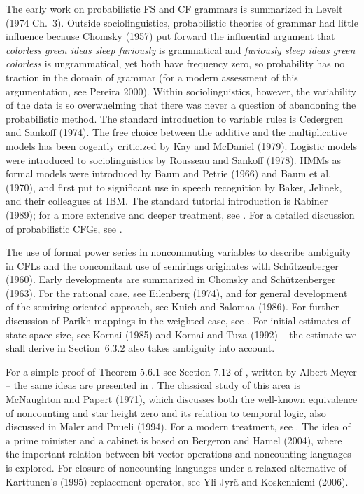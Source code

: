 The early work on probabilistic FS and CF grammars is summarized in Levelt
(1974 Ch.~3).\nocite{Levelt:1974} Outside sociolinguistics, probabilistic
theories of grammar had little influence because Chomsky (1957) put forward
the influential argument that {\it colorless green ideas sleep furiously} is
grammatical and {\it *furiously sleep ideas green colorless} is ungrammatical,
yet both have frequency zero, so probability has no traction in the domain of
grammar (for a modern assessment of this argumentation, see Pereira
2000).\nocite{Pereira:2000} Within sociolinguistics, however, the variability
of the data is so overwhelming that there was never a question of abandoning
the probabilistic method. The standard introduction to variable rules is
Cedergren and Sankoff (1974). The free choice between the additive and the
multiplicative models has been cogently criticized by Kay and McDaniel (1979).
\nocite{Kay:1979} Logistic models were introduced to sociolinguistics by
Rousseau and Sankoff (1978).\nocite{Rousseau:1978} HMMs as formal models were
introduced by Baum and Petrie (1966) and Baum et al. (1970),\nocite{Baum:1966}
\nocite{Baum:1970} and first put to significant use in speech recognition by
Baker, Jelinek, and their colleagues at IBM. The standard tutorial
introduction is Rabiner (1989);\nocite{Rabiner:1989} for a more extensive and
deeper treatment, see .  For a detailed discussion of
probabilistic CFGs, see .

The use of formal power series in noncommuting variables to describe ambiguity
in CFLs and the concomitant use of semirings originates with
\nocite{Schu2tzenberge:1960} Sch\"{u}tzenberger (1960).  Early developments
are summarized in \nocite{Chomsky:1963} Chomsky and Sch\"{u}tzenberger (1963).
For the rational case, see Eilenberg (1974), and for general development of
the semiring-oriented approach, see Kuich and Salomaa (1986).
\nocite{Kuich:1986} For further discussion of Parikh mappings in the weighted
case, see . For initial estimates of state space size, see
Kornai (1985) and Kornai and Tuza (1992) -- the estimate we shall derive in
Section~6.3.2 also takes ambiguity into account. \nocite{Kornai:1985}
\nocite{Kornai:1992}

For a simple proof of Theorem 5.6.1 see Section 7.12 of
, written by Albert Meyer -- the same ideas are
presented in .  The classical study of this area is
McNaughton and Papert (1971), which discusses both the well-known equivalence
of noncounting and star height zero and its relation to temporal logic, also
discussed in Maler and Pnueli (1994). For a modern treatment, see
.  \nocite{Maler:1994}\nocite{Bergeron:2004} The idea of
a prime minister and a cabinet is based on Bergeron and Hamel (2004), where
the important relation between bit-vector operations and noncounting languages
is explored. For closure of noncounting languages under a relaxed alternative
of Karttunen's (1995) replacement operator, see Yli-Jyr\"{a} and Koskenniemi
(2006).\nocite{Karttunen:1995}\nocite{Yli-Jyra2:2006}\nocite{McNaughton:1971}


